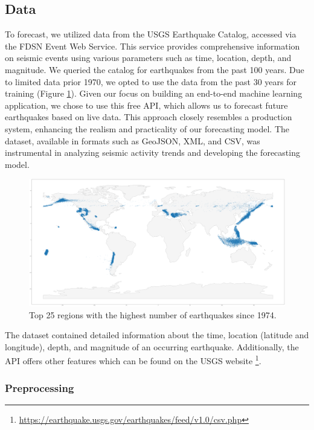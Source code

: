 \subsection{Data}
To forecast, we utilized data from the \ac{USGS} Earthquake Catalog, accessed via
the \ac{FDSN} Event Web Service. This service provides comprehensive information
on seismic events using various parameters such as time, location, depth, and magnitude.
We queried the catalog for earthquakes from the past 100 years. Due to
limited data prior 1970, we opted to use the data from the past 30 years
for training (Figure \ref{fig:world-map}). Given our focus on building an end-to-end machine learning
application, we chose to use this free API, which allows us to forecast
future earthquakes based on live data. This approach closely resembles a
production system, enhancing the realism and practicality of our forecasting
model. The dataset, available in formats such as GeoJSON, XML, and CSV, was
instrumental in analyzing seismic activity trends and developing the forecasting model.


\begin{figure}[hbtp]
  \centering
  \includegraphics[scale=0.13]{img/world-earthquakes-top-25-regions-past-30-years.png}
  \captionsetup{format=hang}
  \caption{\label{fig:world-map}Top 25 regions with the highest number of earthquakes since 1974.}
\end{figure}

The dataset contained detailed information about the time, location (latitude and longitude),
depth, and magnitude of an occurring earthquake. Additionally, the API offers
other features which can be found on the
\ac{USGS} website \footnote{\url{https://earthquake.usgs.gov/earthquakes/feed/v1.0/csv.php}}.

\subsubsection{Preprocessing}


